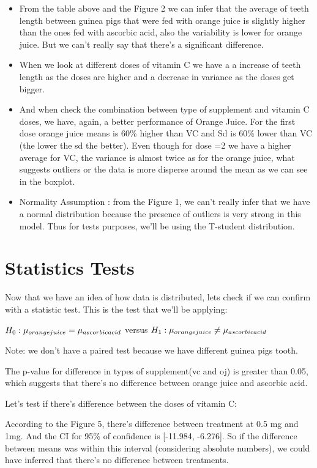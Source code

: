 \documentclass[]{article}
\begin{document}
\begin{itemize}
\item
  From the table above and the Figure 2 we can infer that the average of
  teeth length between guinea pigs that were fed with orange juice is
  slightly higher than the ones fed with ascorbic acid, also the
  variability is lower for orange juice. But we can't really say that
  there's a significant difference.
\item
  When we look at different doses of vitamin C we have a a increase of
  teeth length as the doses are higher and a decrease in variance as the
  doses get bigger.
\item
  And when check the combination between type of supplement and vitamin
  C doses, we have, again, a better performance of Orange Juice. For the
  first dose orange juice means is 60\% higher than VC and Sd is 60\%
  lower than VC (the lower the sd the better). Even though for dose =2
  we have a higher average for VC, the variance is almost twice as for
  the orange juice, what suggests outliers or the data is more disperse
  around the mean as we can see in the boxplot.
\item
  Normality Assumption : from the Figure 1, we can't really infer that
  we have a normal distribution because the presence of outliers is very
  strong in this model. Thus for tests purposes, we'll be using the
  T-student distribution.
\end{itemize}

\section{Statistics Tests}\label{statistics-tests}

Now that we have an idea of how data is distributed, lets check if we
can confirm with a statistic test. This is the test that we'll be
applying:

\def\oj{\rule{0pt}{1.0ex}orangejuice}
\def\vc{\rule{0pt}{1.0ex}ascorbicacid} $H_{0}: \mu_{\oj} = \mu_{\vc}$
versus $H_{1}: \mu_{\oj} \neq \mu_{\vc}$

Note: we don't have a paired test because we have different guinea pigs
tooth.

The p-value for difference in types of supplement(vc and oj) is greater
than 0.05, which suggests that there's no difference between orange
juice and ascorbic acid.

Let's test if there's difference between the doses of vitamin C:

According to the Figure 5, there's difference between treatment at 0.5
mg and 1mg. And the CI for 95\% of confidence is {[}-11.984, -6.276{]}.
So if the difference between means was within this interval (considering
absolute numbers), we could have inferred that there's no difference
between treatments.
\end{document}
